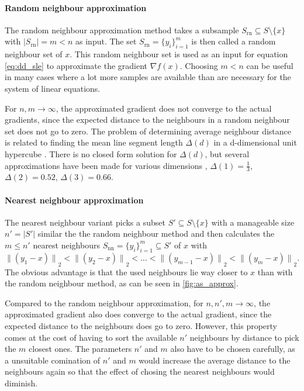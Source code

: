 \documentclass[
  a4paper,  %
  twoside,  %
  bibliography=totoc,
  headsepline,
  cleardoublepage=empty,
  parskip=half,
  draft=false
]{scrbook}
\begin{document}
\paragraph{Random neighbour approximation}
The random neighbour approximation method takes a subsample $S_{\text{rn}} \subseteq S \setminus \{x\}$ with $|S_{\text{rn}}|=m < n$ as input.
The set $S_{\text{rn}}=\{y_i\}_{i=1}^m$ is then called a random neighbour set of $x$.
This random neighbour set is used as an input for equation \cref{eq:dd_sle} to approximate the gradient $\nabla f(x)$.
Choosing $m < n$ can be useful in many cases where a lot more samples are available than are necessary for the system of linear equations.

For $n,m \to \infty$, the approximated gradient does not converge to the actual gradients, since the expected distance to the neighbours in a random neighbour set does not go to zero.
The problem of determining average neighbour distance is related to finding the mean line segment length $\Delta (d)$ in a d-dimensional unit hypercube \cite{Bailey2007}.
There is no closed form solution for $\Delta (d)$, but several approximations have been made for various dimensions \cite{Weisstein}, \eg $\Delta (1)=\frac{1}{3}$, $\Delta (2)=0.52$, $\Delta (3)=0.66$.

\paragraph{Nearest neighbour approximation}
The nearest neighbour variant picks a subset $S' \subseteq S \setminus \{x\}$ with a manageable size $n'=|S'|$ similar the the random neighbour method and then calculates the $m \leq n'$ nearest neighbours $S_{\text{nn}}=\{y_i\}_{i=1}^m \subseteq S'$ of $x$ with
\begin{equation}
{\|(y_1-x)\|}_2 < {\|(y_2-x)\|}_2 < \dots < {\|(y_{m-1}-x)\|}_2 < {\|(y_{m}-x)\|}_2.
\end{equation}
The obvious advantage is that the used neighbours lie way closer to $x$ than with the random neighbour method, as can be seen in \cref{fig:as_approx}.

Compared to the random neighbour approximation, for $n,n',m \to \infty$, the approximated gradient also does converge to the actual gradient, since the expected distance to the neighbours does go to zero.
However, this property comes at the cost of having to sort the available $n'$ neighbours by distance to pick the $m$ closest ones.
The parameters $n'$ and $m$ also have to be chosen carefully, as a unsuitable comination of $n'$ and $m$ would increase the average distance to the neighbours again so that the effect of chosing the nearest neighbours would diminish.
\end{document}
